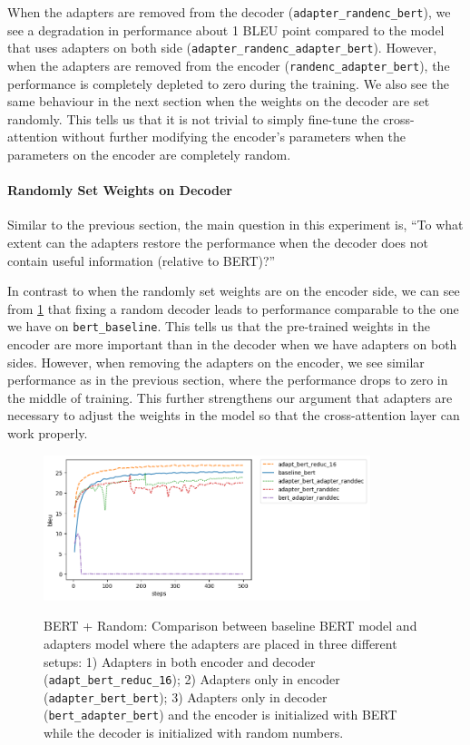 When the adapters are removed from the decoder (\texttt{adapter\_randenc\_bert}), we see a degradation in performance about 1 BLEU point compared to the model that uses adapters on both side (\texttt{adapter\_randenc\_adapter\_bert}). However, when the adapters are removed from the encoder (\texttt{randenc\_adapter\_bert}), the performance is completely depleted to zero during the training. We also see the same behaviour in the next section when the weights on the decoder are set randomly. This tells us that it is not trivial to simply fine-tune the cross-attention without further modifying the encoder's parameters when the parameters on the encoder are completely random.

\paragraph{Randomly Set Weights on Decoder}
Similar to the previous section, the main question in this experiment is, ``To what extent can the adapters restore the performance when the decoder does not contain useful information (relative to BERT)?''

In contrast to when the randomly set weights are on the encoder side, we can see from \cref{img:adapt_bert_randdec} that fixing a random decoder leads to performance comparable to the one we have on \texttt{bert\_baseline}. This tells us that the pre-trained weights in the encoder are more important than in the decoder when we have adapters on both sides. However, when removing the adapters on the encoder, we see similar performance as in the previous section, where the performance drops to zero in the middle of training. This further strengthens our argument that adapters are necessary to adjust the weights in the model so that the cross-attention layer can work properly.

\begin{figure}[h]
    {\includegraphics[width=0.85\textwidth]{img/adapter_bert_randdec.png}}
    \centering
    \caption[BERT + Random: Comparison for model with adapters in the decoder and the decoder is initalized with random weights]{BERT + Random: Comparison between baseline BERT model and adapters model where the adapters are placed in three different setups: 1) Adapters in both encoder and decoder (\texttt{adapt\_bert\_reduc\_16}); 2) Adapters only in encoder (\texttt{adapter\_bert\_bert}); 3) Adapters only in decoder (\texttt{bert\_adapter\_bert}) and the encoder is initialized with BERT while the decoder is initialized with random numbers.}
    \label{img:adapt_bert_randdec}
\end{figure}

